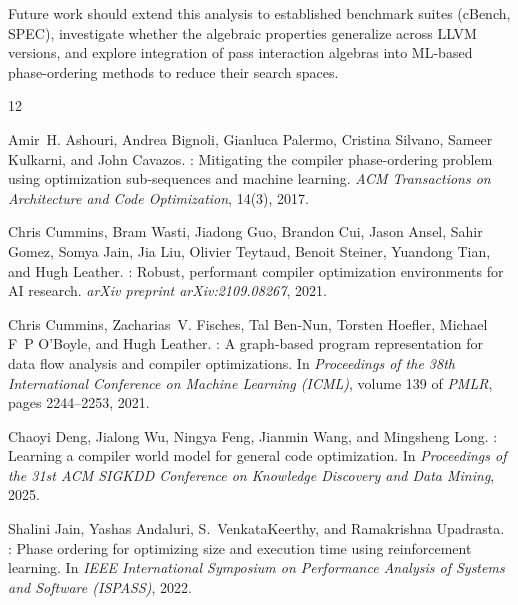 \documentclass[11pt]{article}
\begin{document}
Future work should extend this analysis to established benchmark suites (cBench, SPEC), investigate whether the algebraic properties generalize across LLVM versions, and explore integration of pass interaction algebras into ML-based phase-ordering methods to reduce their search spaces.



\begin{thebibliography}{12}

Amir~H. Ashouri, Andrea Bignoli, Gianluca Palermo, Cristina Silvano, Sameer Kulkarni, and John Cavazos.
: Mitigating the compiler phase-ordering problem using optimization sub-sequences and machine learning.
\newblock \emph{ACM Transactions on Architecture and Code Optimization}, 14(3), 2017.

Chris Cummins, Bram Wasti, Jiadong Guo, Brandon Cui, Jason Ansel, Sahir Gomez, Somya Jain, Jia Liu, Olivier Teytaud, Benoit Steiner, Yuandong Tian, and Hugh Leather.
: Robust, performant compiler optimization environments for {AI} research.
\newblock \emph{arXiv preprint arXiv:2109.08267}, 2021.

Chris Cummins, Zacharias~V. Fisches, Tal Ben-Nun, Torsten Hoefler, Michael F~P O'Boyle, and Hugh Leather.
: A graph-based program representation for data flow analysis and compiler optimizations.
\newblock In \emph{Proceedings of the 38th International Conference on Machine Learning (ICML)}, volume 139 of \emph{PMLR}, pages 2244--2253, 2021.

Chaoyi Deng, Jialong Wu, Ningya Feng, Jianmin Wang, and Mingsheng Long.
: Learning a compiler world model for general code optimization.
\newblock In \emph{Proceedings of the 31st ACM SIGKDD Conference on Knowledge Discovery and Data Mining}, 2025.

Shalini Jain, Yashas Andaluri, S.~VenkataKeerthy, and Ramakrishna Upadrasta.
: Phase ordering for optimizing size and execution time using reinforcement learning.
\newblock In \emph{IEEE International Symposium on Performance Analysis of Systems and Software (ISPASS)}, 2022.


\end{thebibliography}
\end{document}
